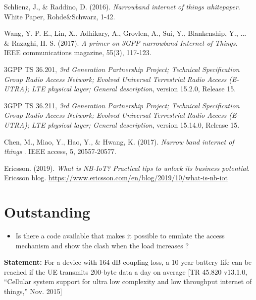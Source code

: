 \documentclass[10pt,a4paper,titlepage,twoside]{article}
\newcommand{\hh}[1]{\textbf{\color{ymaorng} #1}}
\newcommand{\point}[1]{\textbf{\color{ymared} #1}}
\begin{document}
\begin{thebibliography}{4}
Schlienz, J., \& Raddino, D. (2016).
\textit{Narrowband internet of things whitepaper}. White Paper, Rohde\&Schwarz, 1-42.

Wang, Y. P. E., Lin, X., Adhikary, A., Grovlen, A., Sui, Y., Blankenship, Y., ... \& Razaghi, H. S. (2017).
\textit{A primer on 3GPP narrowband Internet of Things}. IEEE communications magazine, 55(3), 117-123.

3GPP TS 36.201,
\textit{3rd Generation Partnership Project; Technical Specification Group Radio Access Network; Evolved Universal Terrestrial Radio Access (E-UTRA); LTE physical layer; General description}, version 15.2.0, Release 15.

3GPP TS 36.211,
\textit{3rd Generation Partnership Project; Technical Specification Group Radio Access Network; Evolved Universal Terrestrial Radio Access (E-UTRA); LTE physical layer; General description}, version 15.14.0, Release 15.

Chen, M., Miao, Y., Hao, Y., \& Hwang, K. (2017).
\textit{Narrow band internet of things}
. IEEE access, 5, 20557-20577.

Ericsson. (2019).
\textit{What is NB-IoT? Practical tips to unlock its business potential}.
Ericsson blog.
\url{https://www.ericsson.com/en/blog/2019/10/what-is-nb-iot}

\end{thebibliography}


\clearpage
\section{\point{Outstanding}}

\begin{itemize}
\item Is there a code available that makes it possible to emulate the access mechanism and show the clash when the load increases ?

\end{itemize}

\hh{Statement:} For a device with 164 dB coupling loss, a 10-year battery life can be reached if the UE transmits 200-byte data a day on average {[TR 45.820 v13.1.0, “Cellular system support for ultra low complexity and low throughput internet of things,” Nov. 2015]}
\end{document}
